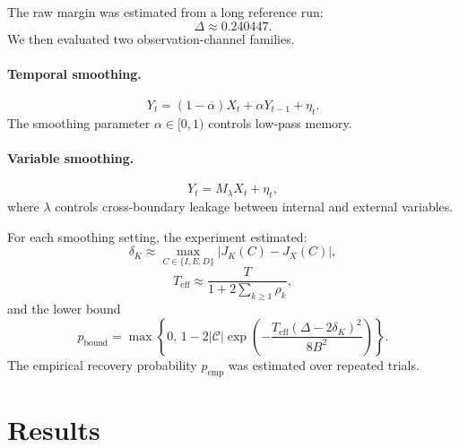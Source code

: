 \documentclass[10pt]{article}
\newcommand{\cC}{\mathcal{C}}
\newcommand{\eff}{\mathrm{eff}}
\begin{document}
The raw margin was estimated from a long reference run:
\[
\Delta \approx 0.240447.
\]
We then evaluated two observation-channel families.

\paragraph{Temporal smoothing.}
\[
Y_t=(1-\alpha)X_t+\alpha Y_{t-1}+\eta_t.
\]
The smoothing parameter \(\alpha\in[0,1)\) controls low-pass memory.

\paragraph{Variable smoothing.}
\[
Y_t=M_\lambda X_t+\eta_t,
\]
where \(\lambda\) controls cross-boundary leakage between internal and external variables.

For each smoothing setting, the experiment estimated:
\[
\delta_K\approx \max_{C\in\{I,E,D\}}|J_K(C)-J_X(C)|,
\]
\[
T_{\eff}\approx
\frac{T}{1+2\sum_{k\ge1}\rho_k},
\]
and the lower bound
\[
p_{\mathrm{bound}}
=
\max\left\{
0,\,
1-
2|\cC|
\exp\!\left(
-\frac{T_{\eff}(\Delta-2\delta_K)^2}{8B^2}
\right)
\right\}.
\]
The empirical recovery probability \(p_{\mathrm{emp}}\) was estimated over repeated trials.

\section{Results}
\end{document}
